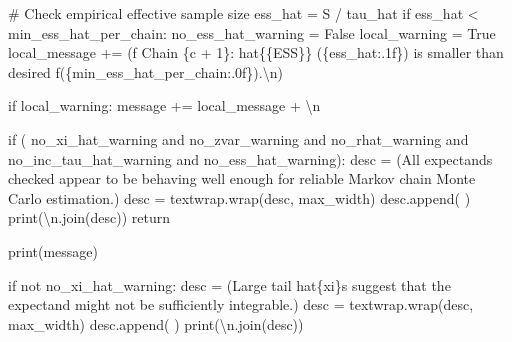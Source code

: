 \documentclass[
  letterpaper,
  DIV=11,
  numbers=noendperiod]{scrartcl}
\newenvironment{Shaded}{\begin{snugshade}}{\end{snugshade}}
\newcommand{\BuiltInTok}[1]{\textcolor[rgb]{0.00,0.23,0.31}{#1}}
\newcommand{\CharTok}[1]{\textcolor[rgb]{0.13,0.47,0.30}{#1}}
\newcommand{\CommentTok}[1]{\textcolor[rgb]{0.37,0.37,0.37}{#1}}
\newcommand{\ControlFlowTok}[1]{\textcolor[rgb]{0.00,0.23,0.31}{#1}}
\newcommand{\DecValTok}[1]{\textcolor[rgb]{0.68,0.00,0.00}{#1}}
\newcommand{\KeywordTok}[1]{\textcolor[rgb]{0.00,0.23,0.31}{#1}}
\newcommand{\NormalTok}[1]{\textcolor[rgb]{0.00,0.23,0.31}{#1}}
\newcommand{\OperatorTok}[1]{\textcolor[rgb]{0.37,0.37,0.37}{#1}}
\newcommand{\SpecialCharTok}[1]{\textcolor[rgb]{0.37,0.37,0.37}{#1}}
\newcommand{\SpecialStringTok}[1]{\textcolor[rgb]{0.13,0.47,0.30}{#1}}
\newcommand{\StringTok}[1]{\textcolor[rgb]{0.13,0.47,0.30}{#1}}
\newcommand{\VariableTok}[1]{\textcolor[rgb]{0.07,0.07,0.07}{#1}}
\begin{document}
\begin{Shaded}
\begin{Highlighting}[]
      \CommentTok{\# Check empirical effective sample size}
\NormalTok{      ess\_hat }\OperatorTok{=}\NormalTok{ S }\OperatorTok{/}\NormalTok{ tau\_hat}
      \ControlFlowTok{if}\NormalTok{ ess\_hat }\OperatorTok{\textless{}}\NormalTok{ min\_ess\_hat\_per\_chain:}
\NormalTok{        no\_ess\_hat\_warning }\OperatorTok{=} \VariableTok{False}
\NormalTok{        local\_warning }\OperatorTok{=} \VariableTok{True}
\NormalTok{        local\_message }\OperatorTok{+=}\NormalTok{ (}\SpecialStringTok{f\textquotesingle{}  Chain }\SpecialCharTok{\{}\NormalTok{c }\OperatorTok{+} \DecValTok{1}\SpecialCharTok{\}}\SpecialStringTok{: hat}\CharTok{\{\{}\SpecialStringTok{ESS}\CharTok{\}\}}\SpecialStringTok{ (}\SpecialCharTok{\{}\NormalTok{ess\_hat}\SpecialCharTok{:.1f\}}\SpecialStringTok{) \textquotesingle{}}
                          \StringTok{\textquotesingle{}is smaller than desired \textquotesingle{}}
                          \SpecialStringTok{f\textquotesingle{}(}\SpecialCharTok{\{}\NormalTok{min\_ess\_hat\_per\_chain}\SpecialCharTok{:.0f\}}\SpecialStringTok{).}\CharTok{\textbackslash{}n}\SpecialStringTok{\textquotesingle{}}\NormalTok{)}

    \ControlFlowTok{if}\NormalTok{ local\_warning:}
\NormalTok{      message }\OperatorTok{+=}\NormalTok{ local\_message }\OperatorTok{+} \StringTok{\textquotesingle{}}\CharTok{\textbackslash{}n}\StringTok{\textquotesingle{}}

  \ControlFlowTok{if}\NormalTok{ (    no\_xi\_hat\_warning }\KeywordTok{and}\NormalTok{ no\_zvar\_warning}
      \KeywordTok{and}\NormalTok{ no\_rhat\_warning   }\KeywordTok{and}\NormalTok{ no\_inc\_tau\_hat\_warning}
      \KeywordTok{and}\NormalTok{ no\_ess\_hat\_warning):}
\NormalTok{    desc }\OperatorTok{=}\NormalTok{ (}\StringTok{\textquotesingle{}All expectands checked appear to be behaving well enough \textquotesingle{}}
            \StringTok{\textquotesingle{}for reliable Markov chain Monte Carlo estimation.\textquotesingle{}}\NormalTok{)}
\NormalTok{    desc }\OperatorTok{=}\NormalTok{ textwrap.wrap(desc, max\_width)}
\NormalTok{    desc.append(}\StringTok{\textquotesingle{} \textquotesingle{}}\NormalTok{)}
    \BuiltInTok{print}\NormalTok{(}\StringTok{\textquotesingle{}}\CharTok{\textbackslash{}n}\StringTok{\textquotesingle{}}\NormalTok{.join(desc))}
    \ControlFlowTok{return}

  \BuiltInTok{print}\NormalTok{(message)}

  \ControlFlowTok{if} \KeywordTok{not}\NormalTok{ no\_xi\_hat\_warning:}
\NormalTok{    desc }\OperatorTok{=}\NormalTok{ (}\StringTok{\textquotesingle{}Large tail hat}\SpecialCharTok{\{xi\}}\StringTok{s suggest that the expectand \textquotesingle{}}
            \StringTok{\textquotesingle{}might not be sufficiently integrable.\textquotesingle{}}\NormalTok{)}
\NormalTok{    desc }\OperatorTok{=}\NormalTok{ textwrap.wrap(desc, max\_width)}
\NormalTok{    desc.append(}\StringTok{\textquotesingle{} \textquotesingle{}}\NormalTok{)}
    \BuiltInTok{print}\NormalTok{(}\StringTok{\textquotesingle{}}\CharTok{\textbackslash{}n}\StringTok{\textquotesingle{}}\NormalTok{.join(desc))}


\end{Highlighting}
\end{Shaded}
\end{document}
